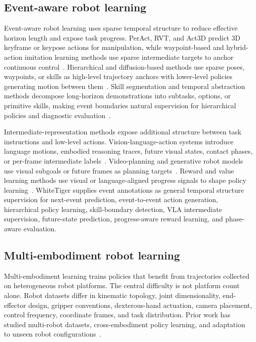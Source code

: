 \subsection{Event-aware robot learning}

Event-aware robot learning uses sparse temporal structure to reduce effective horizon length and expose task progress. PerAct, RVT, and Act3D predict 3D keyframe or keypose actions for manipulation, while waypoint-based and hybrid-action imitation learning methods use sparse intermediate targets to anchor continuous control~\cite{shridhar2022peract,goyal2023rvt,gervet2023act3d,shi2023waypointbased,belkhale2023hydra}. Hierarchical and diffusion-based methods use sparse poses, waypoints, or skills as high-level trajectory anchors with lower-level policies generating motion between them~\cite{ke2024diffuseractor,ma2024hdp,liang2023skilldiffuser}. Skill segmentation and temporal abstraction methods decompose long-horizon demonstrations into subtasks, options, or primitive skills, making event boundaries natural supervision for hierarchical policies and diagnostic evaluation~\cite{shiarlis2018taco,pertsch2020spirl,mao2024dexskills}.

Intermediate-representation methods expose additional structure between task instructions and low-level actions. Vision-language-action systems introduce language motions, embodied reasoning traces, future visual states, contact phases, or per-frame intermediate labels~\cite{belkhale2024rth,zawalski2024ecot,zhao2025cotvla,li2025switchvla,li2026robointer}. Video-planning and generative robot models use visual subgoals or future frames as planning targets~\cite{du2023unipi,wu2023gr1,zhao2025cotvla}. Reward and value learning methods use visual or language-aligned progress signals to shape policy learning~\cite{zakka2021xirl,ma2022vip,ma2023liv,sontakke2023roboclip}. WhiteTiger supplies event annotations as general temporal structure supervision for next-event prediction, event-to-event action generation, hierarchical policy learning, skill-boundary detection, VLA intermediate supervision, future-state prediction, progress-aware reward learning, and phase-aware evaluation.

\subsection{Multi-embodiment robot learning}

Multi-embodiment learning trains policies that benefit from trajectories collected on heterogeneous robot platforms. The central difficulty is not platform count alone. Robot datasets differ in kinematic topology, joint dimensionality, end-effector design, gripper conventions, dexterous-hand actuation, camera placement, control frequency, coordinate frames, and task distribution. Prior work has studied multi-robot datasets, cross-embodiment policy learning, and adaptation to unseen robot configurations~\cite{dasari2020robonet,oneill2023openx,bousmalis2023robocat,ghosh2024octo,xu2023xskill,liu2024rdt1b}.

